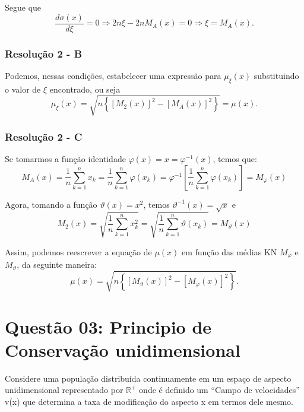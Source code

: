 Segue que
\[\dfrac{d\sigma(x)}{d\xi} = 0
\Rightarrow
2n\xi-2n M_A(x) = 0
\Rightarrow
\xi = M_A(x).
\]


\subsection*{\blue Resolução 2 - \textbf{B}}


Podemos, nessas condições, estabelecer uma expressão para \(\mu_\xi(x)\) substituindo o valor de \(\xi\) encontrado, ou seja
\[\mu_\xi(x) = \sqrt{n\left\{[M_2(x)]^2-\left[M_A(x)\right]^2\right\}} = \mu(x).\]


\subsection*{\blue Resolução 2 - \textbf{C}}


Se tomarmos a função identidade \(\varphi(x) = x = \varphi^{-1}(x)\), temos que:
\[M_A(x)
= \dfrac{1}{n} \displaystyle\sum_{k=1}^{n} x_k
= \dfrac{1}{n} \displaystyle\sum_{k=1}^{n} \varphi(x_k)
= \varphi^{-1} \left[\dfrac{1}{n} \displaystyle\sum_{k=1}^{n} \varphi(x_k)\right]
= M_\varphi(x)
\]

Agora, tomando a função \(\vartheta(x) = x^2\), temos \(\vartheta^{-1}(x) = \sqrt{x}\) e
\[M_2(x)
= \sqrt{\dfrac{1}{n} \displaystyle\sum_{k=1}^{n} x_k^2}
= \sqrt{\dfrac{1}{n} \displaystyle\sum_{k=1}^{n} \vartheta(x_k)}
= M_\vartheta(x)
\]

Assim, podemos reescrever a equação de \(\mu(x)\) em função das médias KN \(M_\varphi\) e \(M_\vartheta\), da seguinte maneira:
\[\mu(x) = \sqrt{n\left\{[M_\vartheta(x)]^2-\left[M_\varphi(x)\right]^2\right\}}.\]





\clearpage
\chapter*{Questão 03: Principio de Conservação unidimensional}

Considere uma população distribuída continuamente em um espaço de aspecto unidimensional representado por \(\mathbb{R}^+\) onde é definido um ``Campo de velocidades'' v(x) que determina a taxa de modificação do aspecto x em termos dele mesmo.

